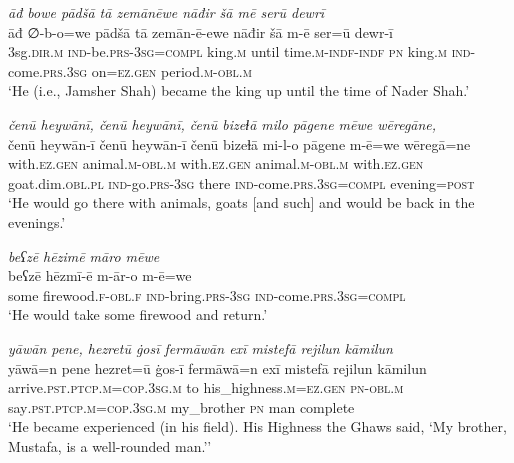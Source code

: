 \ea \label{DP.53}
\textit{āđ bowe pādšā tā zemānēwe nāđir šā mē serū dewrī} \\ 
\gll āđ ∅-b-o=we pādšā tā zemān-ē-ewe nāđir šā m-ē ser=ū dewr-ī \\ 
 3sg\textsc{.dir}\textsc{.m} \textsc{ind-}be\textsc{.prs}\textsc{-3sg}\textsc{=\textsc{compl}} king\textsc{.m} until time\textsc{.m}\textsc{-indf}\textsc{-indf} \textsc{pn} king\textsc{.m} \textsc{ind-}come\textsc{.prs}\textsc{.3sg} on\textsc{=ez}\textsc{.gen} period\textsc{.m}\textsc{-obl}\textsc{.m} \\ 
\glt `He (i.e., Jamsher Shah) became the king up until the time of Nader Shah.'
\z 
 
\ea \label{ZP.12}
\textit{čenū heywānī, čenū heywānī, čenū bizeɫā milo pāgene mēwe wēregāne,} \\ 
\gll čenū heywān-ī čenū heywān-ī čenū bizeɫā mi-l-o pāgene m-ē=we wēregā=ne \\ 
 with\textsc{.ez.gen} animal\textsc{.m}\textsc{-obl}\textsc{.m} with\textsc{.ez.gen} animal\textsc{.m}\textsc{-obl}\textsc{.m} with\textsc{.ez.gen} goat.dim\textsc{.obl}\textsc{.pl} \textsc{ind-}go\textsc{.prs}\textsc{-3sg} there \textsc{ind-}come\textsc{.prs}\textsc{.3sg}\textsc{=compl} evening\textsc{=\textsc{post}} \\ 
\glt `He would go there with animals, goats [and such] and would be back in the evenings.'
\z 
 
\ea \label{ZP.13}
\textit{beʕzē hēzimē māro mēwe} \\ 
\gll beʕzē hēzmī-ē m-ār-o m-ē=we \\ 
 some firewood\textsc{.f}\textsc{-obl}\textsc{.f} \textsc{ind-}bring\textsc{.prs}\textsc{-3sg} \textsc{ind-}come\textsc{.prs}\textsc{.3sg}\textsc{=compl} \\ 
\glt `He would take some firewood and return.'
\z 
 
\ea \label{ZP.18}
\textit{yāwān pene, hezretū ġosī fermāwān exī mistefā rejilun kāmilun} \\ 
\gll yāwā=n pene hezret=ū ġos-ī fermāwā=n exī mistefā rejilun kāmilun \\ 
 arrive\textsc{.pst}\textsc{.ptcp}\textsc{.m}\textsc{=cop}\textsc{.3sg}\textsc{.m} to his\_highness\textsc{.m}\textsc{\textsc{=ez.gen}} \textsc{pn}\textsc{-obl}\textsc{.m} say\textsc{.pst}\textsc{.ptcp}\textsc{.m}\textsc{=cop}\textsc{.3sg}\textsc{.m} my\_brother \textsc{pn} man complete \\ 
\glt `He became experienced (in his field). His Highness the Ghaws said, ‘My brother, Mustafa, is a well-rounded man.’'
\z 
 
